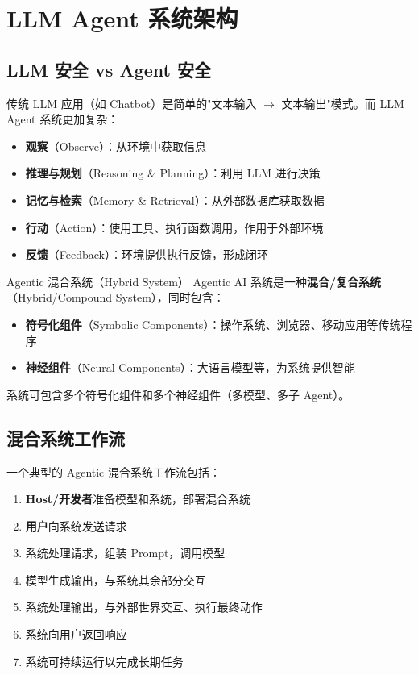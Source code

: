 \section{LLM Agent 系统架构}

\subsection{LLM 安全 vs Agent 安全}

传统 LLM 应用（如 Chatbot）是简单的"文本输入 $\to$ 文本输出"模式。而 LLM Agent 系统更加复杂：

\begin{itemize}
    \item \textbf{观察}（Observe）：从环境中获取信息
    \item \textbf{推理与规划}（Reasoning \& Planning）：利用 LLM 进行决策
    \item \textbf{记忆与检索}（Memory \& Retrieval）：从外部数据库获取数据
    \item \textbf{行动}（Action）：使用工具、执行函数调用，作用于外部环境
    \item \textbf{反馈}（Feedback）：环境提供执行反馈，形成闭环
\end{itemize}

\begin{importantbox}{Agentic 混合系统（Hybrid System）}
Agentic AI 系统是一种\textbf{混合/复合系统}（Hybrid/Compound System），同时包含：
\begin{itemize}
    \item \textbf{符号化组件}（Symbolic Components）：操作系统、浏览器、移动应用等传统程序
    \item \textbf{神经组件}（Neural Components）：大语言模型等，为系统提供智能
\end{itemize}
系统可包含多个符号化组件和多个神经组件（多模型、多子 Agent）。
\end{importantbox}

\subsection{混合系统工作流}

一个典型的 Agentic 混合系统工作流包括：
\begin{enumerate}
    \item \textbf{Host/开发者}准备模型和系统，部署混合系统
    \item \textbf{用户}向系统发送请求
    \item 系统处理请求，组装 Prompt，调用模型
    \item 模型生成输出，与系统其余部分交互
    \item 系统处理输出，与外部世界交互、执行最终动作
    \item 系统向用户返回响应
    \item 系统可持续运行以完成长期任务
\end{enumerate}

